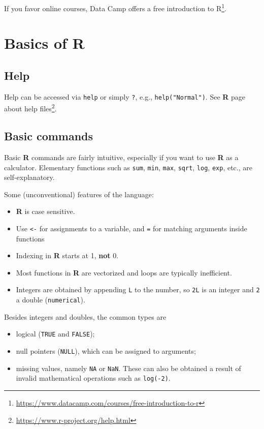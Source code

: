 \documentclass[
]{book}
\providecommand{\tightlist}{%
  \setlength{\itemsep}{0pt}\setlength{\parskip}{0pt}}
\renewcommand{\href}[2]{#2\footnote{\url{#1}}}
\begin{document}
If you favor online courses, Data Camp offers a \href{https://www.datacamp.com/courses/free-introduction-to-r}{free introduction to R}.

\hypertarget{basics-of-r}{%
\section{\texorpdfstring{Basics of \textbf{R}}{Basics of R}}\label{basics-of-r}}

\hypertarget{help}{%
\subsection{Help}\label{help}}

Help can be accessed via \texttt{help} or simply \texttt{?}, e.g., \texttt{help("Normal")}. \href{https://www.r-project.org/help.html}{See \textbf{R} page about help files}.

\hypertarget{basic-commands}{%
\subsection{Basic commands}\label{basic-commands}}

Basic \textbf{R} commands are fairly intuitive, especially if you want to use \textbf{R} as a calculator.
Elementary functions such as \texttt{sum}, \texttt{min}, \texttt{max}, \texttt{sqrt}, \texttt{log}, \texttt{exp}, etc., are self-explanatory.

Some (unconventional) features of the language:

\begin{itemize}
\tightlist
\item
  \textbf{R} is case sensitive.
\item
  Use \texttt{\textless{}-} for assignments to a variable, and \texttt{=} for matching arguments inside functions
\item
  Indexing in \textbf{R} starts at 1, \textbf{not} 0.
\item
  Most functions in \textbf{R} are vectorized and loops are typically inefficient.
\item
  Integers are obtained by appending \texttt{L} to the number, so \texttt{2L} is an integer and \texttt{2} a double (\texttt{numerical}).
\end{itemize}

Besides integers and doubles, the common types are

\begin{itemize}
\tightlist
\item
  logical (\texttt{TRUE} and \texttt{FALSE});
\item
  null pointers (\texttt{NULL}), which can be assigned to arguments;
\item
  missing values, namely \texttt{NA} or \texttt{NaN}. These can also be obtained a result of invalid mathematical operations such as \texttt{log(-2)}.
\end{itemize}
\end{document}
